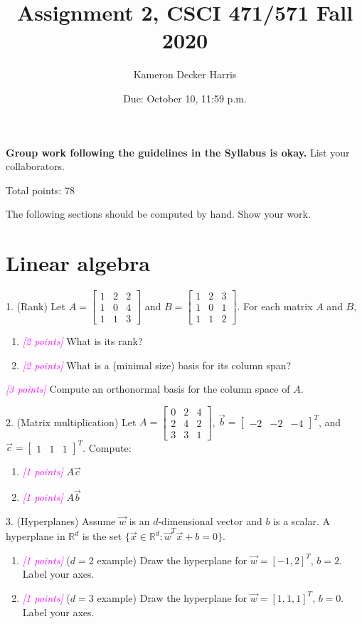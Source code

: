 \documentclass{article}
\title{Assignment 2, CSCI 471/571 Fall 2020}
\date{Due: October 10, 11:59 p.m.}
\author{Kameron Decker Harris}
\newcommand{\R}{\mathbb{R}} %
\newcommand{\points}[1]{\small\textcolor{magenta}{\emph{[#1 points]}} \normalsize}
\begin{document}
\maketitle

{\bf Group work following the guidelines in the Syllabus is okay.}
List your collaborators.

Total points: 78

\vspace{1em}
The following sections should be computed by hand. Show your work.
\section*{Linear algebra}
1. (Rank)
Let 
$A = \begin{bmatrix} 1 & 2 & 2 \\ 1 & 0 & 4 \\ 1 & 1 & 3 \end{bmatrix}$ and
$B = \begin{bmatrix} 1 & 2 & 3 \\ 1 & 0 & 1 \\ 1 & 1 & 2 \end{bmatrix}$.
For each matrix $A$ and $B$,
\begin{enumerate} 
\item \points{2} What is its rank? 
\item \points{2} What is a (minimal size) basis for its column span?
\end{enumerate}
\points{3} Compute an orthonormal basis for the column space of $A$.


2. (Matrix multiplication) 
Let 
$A = \begin{bmatrix} 0 & 2 & 4 \\ 2 & 4 & 2 \\ 3 & 3 & 1 \end{bmatrix}$, 
$\vec{b} = \begin{bmatrix} -2 & -2 & -4 \end{bmatrix}^T$, and 
$\vec{c} = \begin{bmatrix} 1 & 1 & 1 \end{bmatrix}^T$.
Compute:
\begin{enumerate}
\item \points{1} $A \vec{c}$
\item \points{1} $A \vec{b}$
\end{enumerate}

3. (Hyperplanes) Assume $\vec w$ is an $d$-dimensional vector and $b$ is a scalar.
A hyperplane in $\R^d$ is the set 
$\{\vec x \in \R^d: \vec w^T \vec x + b = 0\}$.
\begin{enumerate}
\item \points{1} ($d=2$ example) Draw the hyperplane for $\vec w=[-1,2]^T$, $b=2$. Label your axes.
\item \points{1} ($d=3$ example) Draw the hyperplane for $\vec w=[1,1,1]^T$, $b=0$. Label your axes.
\end{enumerate}
\end{document}
